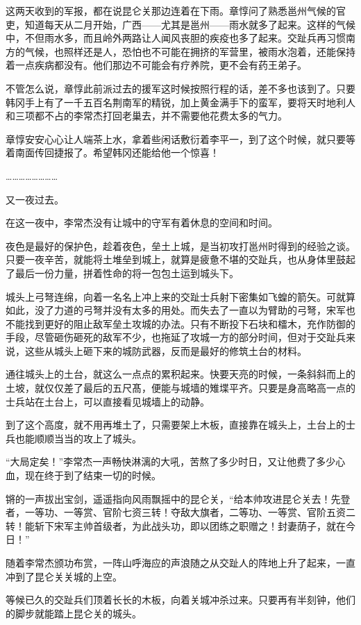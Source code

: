 这两天收到的军报，都在说昆仑关那边连着在下雨。章惇问了熟悉邕州气候的官吏，知道每天从二月开始，广西——尤其是邕州——雨水就多了起来。这样的气候中，不但雨水多，而且岭外两路让人闻风丧胆的疾疫也多了起来。交趾兵再习惯南方的气候，也照样还是人，恐怕也不可能在拥挤的军营里，被雨水泡着，还能保持着一点疾病都没有。他们那边不可能会有疗养院，更不会有药王弟子。

不管怎么说，章惇此前派过去的援军这时候按照行程的话，差不多也该到了。只要韩冈手上有了一千五百名荆南军的精锐，加上黄金满手下的蛮军，要将天时地利人和三项都不占的李常杰打回老巢去，并不需要他花费太多的气力。

章惇安安心心让人端茶上水，拿着些闲话敷衍着李平一，到了这个时候，就只要等着南面传回捷报了。希望韩冈还能给他一个惊喜！

……………………

又一夜过去。

在这一夜中，李常杰没有让城中的守军有着休息的空间和时间。

夜色是最好的保护色，趁着夜色，垒土上城，是当初攻打邕州时得到的经验之谈。只要一夜辛苦，就能将土堆垒到城上，就算是疲惫不堪的交趾兵，也从身体里鼓起了最后一份力量，拼着性命的将一包包土运到城头下。

城头上弓弩连绵，向着一名名上冲上来的交趾士兵射下密集如飞蝗的箭矢。可就算如此，没了力道的弓弩并没有太多的用处。而失去了一直以为臂助的弓弩，宋军也不能找到更好的阻止敌军垒土攻城的办法。只有不断投下石块和檑木，充作防御的手段，尽管砸伤砸死的敌军不少，也拖延了攻城一方的部分时间，但对于交趾兵来说，这些从城头上砸下来的城防武器，反而是最好的修筑土台的材料。

通往城头上的土台，就这么一点点的累积起来。快要天亮的时候，一条斜斜而上的土坡，就仅仅差了最后的五尺髙，便能与城墙的雉堞平齐。只要是身高略高一点的士兵站在土台上，可以直接看见城墙上的动静。

到了这个高度，就不用再堆土了，只需要架上木板，直接靠在城头上，土台上的士兵也能顺顺当当的攻上了城头。

“大局定矣！”李常杰一声畅快淋漓的大吼，苦熬了多少时日，又让他费了多少心血，现在终于到了结束一切的时候。

锵的一声拔出宝剑，遥遥指向风雨飘摇中的昆仑关，“给本帅攻进昆仑关去！先登者，一等功、一等赏、官阶七资三转！夺敌大旗者，二等功、一等赏、官阶五资二转！能斩下宋军主帅首级者，为此战头功，即以团练之职赠之！封妻荫子，就在今日！”

随着李常杰颁功布赏，一阵山呼海应的声浪随之从交趾人的阵地上升了起来，一直冲到了昆仑关关城的上空。

等候已久的交趾兵们顶着长长的木板，向着关城冲杀过来。只要再有半刻钟，他们的脚步就能踏上昆仑关的城头。

